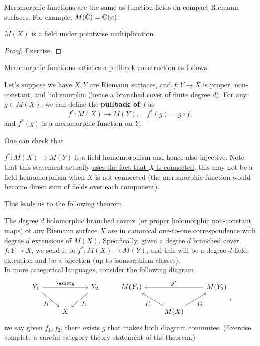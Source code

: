 \documentclass{article}
\begin{document}
{\begin{remark}
    Meromorphic functions are the same as function fields on compact Riemann surfaces. For example, $M(\hat{\mathbb{C}}) = \mathbb{C}(x)$.
\end{remark}

\begin{theorem}
    $M(X)$ is a field under pointwise multiplication.
\end{theorem}

\begin{proof}
    Exercise.
\end{proof}

Meromorphic functions satisfies a pullback construction as follows.\\

\begin{definition}
Let's suppose we have $X, Y$ are Riemann surfaces, and $f: Y \to X$ is proper, non-constant, and holomorphic (hence a branched cover of finite degree $d$). For any $g \in M(X)$, we can define the \textbf{pullback of $f$} as
\[f^*: M(X) \to M(Y),\quad f^*(g) = g \circ f,\]
and $f^*(g)$ is a meromorphic function on $Y$.    
\end{definition}

One can check that
\begin{proposition}
    $f^*: M(X) \to M(Y)$ is a field homomorphism and hence also injective. Note that this statement actually \underline{uses the fact that $X$ is connected}, this may not be a field homomorphism when $X$ is not connected (the meromorphic function would become direct sum of fields over each component).
\end{proposition}

This leads us to the following theorem
\begin{theorem}
    The degree $d$ holomorphic branched covers (or proper holomorphic non-constant maps) of any Riemann surface $X$ are in canonical one-to-one correspondence with degree $d$ extensions of $M(X)$. Specifically, given a degree $d$ branched cover $f: Y \to X$, we send it to $f^*: M(X) \to M(Y)$, and this will be a degree $d$ field extension and be a bijection (up to isomorphism classes).\\

    In more categorical languages, consider the following diagram
\[\begin{tikzcd}
	{Y_1} && {Y_2} & {M(Y_1)} && {M(Y_2)} \\
	& X &&& {M(X)}
	\arrow["{f_1}"', from=1-1, to=2-2]
	\arrow["{f_2}", from=1-3, to=2-2]
	\arrow["{f_1^*}", from=2-5, to=1-4]
	\arrow["{f_2^*}"', from=2-5, to=1-6]
	\arrow["{\exist g}", from=1-1, to=1-3]
	\arrow["{g^*}"', from=1-6, to=1-4]
\end{tikzcd},\]
we say given $f_1, f_2$, there exists $g$ that makes both diagram commutes. (Exercise. complete a careful category theory statement of the theorem.)
\end{theorem}

}
\end{document}
